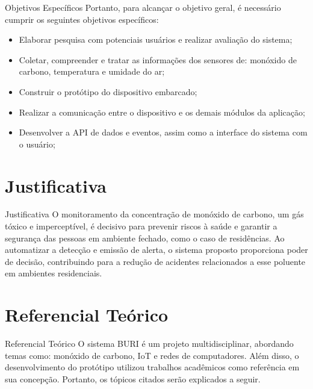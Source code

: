 \documentclass[12pt]{beamer}
\begin{document}
    \begin{frame}{Objetivos Específicos}
        Portanto, para alcançar o objetivo geral, é necessário cumprir os seguintes objetivos específicos:
        \begin{itemize}
            \item Elaborar pesquisa com potenciais usuários e realizar avaliação do sistema;
            \item Coletar, compreender e tratar as informações dos sensores de: monóxido de carbono, temperatura e umidade do ar;
            \item Construir o protótipo do dispositivo embarcado;
            \item Realizar a comunicação entre o dispositivo e os demais módulos da aplicação;
            \item Desenvolver a API de dados e eventos, assim como a interface do sistema com o usuário;
        \end{itemize} 
    \end{frame}

    \section{Justificativa}

    \begin{frame}{Justificativa}
        O monitoramento da concentração de monóxido de carbono, um gás tóxico e imperceptível, é decisivo para prevenir riscos 
        à saúde e garantir a segurança das pessoas em ambiente fechado, como o caso de residências. Ao automatizar a detecção e 
        emissão de alerta, o sistema proposto proporciona poder de decisão, contribuindo para a redução de acidentes
        relacionados a esse poluente em ambientes residenciais.   
    \end{frame}

    \section{Referencial Teórico}

    \begin{frame}{Referencial Teórico}
        O sistema BURI é um projeto multidisciplinar, abordando temas como: 
        monóxido de carbono, IoT e redes de computadores. Além disso, o desenvolvimento do  
        protótipo utilizou trabalhos acadêmicos como referência em sua concepção. Portanto, 
        os tópicos citados serão explicados a seguir.
    \end{frame}
\end{document}
